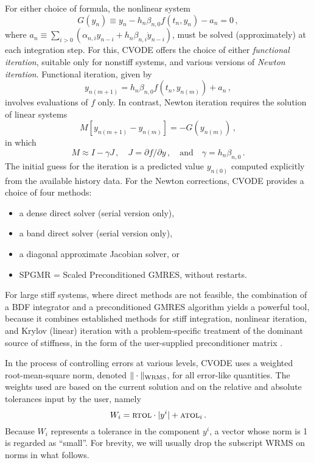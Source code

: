 For either choice of formula, the nonlinear system
\begin{equation}\label{NLS}
  G(y_n) \equiv y_n - h_n \beta_{n,0} f(t_n,y_n) - a_n = 0 \, ,
\end{equation}
where $a_n\equiv\sum_{i>0}(\alpha_{n,i}y_{n-i}+h_n\beta_{n,i}\dot{y}_{n-i})$, 
must be solved (approximately) at each integration step.  For this, CVODE
offers the choice of either {\em functional iteration}, suitable only
for nonstiff systems, and various versions of {\em Newton iteration}.
Functional iteration, given by
\[ y_{n(m+1)} = h_n \beta_{n,0} f(t_n,y_{n(m)}) + a_n \, , \]
involves evaluations of $f$ only.  In contrast, Newton iteration requires
the solution of linear systems
\begin{equation*}
  M [y_{n(m+1)} - y_{n(m)}] = -G(y_{n(m)}) \, ,
\end{equation*}
in which
\begin{equation}\label{Newtonmat} 
  M \approx I - \gamma J \, ,
  \quad J = \partial f / \partial y \, ,
  \quad \mbox{and} \quad
  \gamma = h_n \beta_{n,0} \, . 
\end{equation}
The initial guess for the iteration is a predicted value $y_{n(0)}$
computed explicitly from the available history data.
For the Newton corrections, CVODE provides a choice of four methods:
\begin{itemize}
\item a dense direct solver (serial version only),
\item a band direct solver (serial version only),
\item a diagonal approximate Jacobian solver, or
\item SPGMR = Scaled Preconditioned GMRES, without restarts.
\end{itemize}
For large stiff systems, where direct methods are not feasible, the
combination of a BDF integrator and a preconditioned GMRES algorithm
yields a powerful tool, because it combines established methods for
stiff integration, nonlinear iteration, and Krylov (linear) iteration
with a problem-specific treatment of the dominant source of stiffness,
in the form of the user-supplied preconditioner matrix \cite{BrHi:89}.

In the process of controlling errors at various levels, CVODE uses a
weighted root-mean-square norm, denoted $\|\cdot\|_{\mbox{\scriptsize
WRMS}}$, for all 
error-like quantities.  The weights used are based on the current
solution and on the relative and absolute tolerances input by the
user, namely
\begin{equation}\label{errwt}
 W_i = \mbox{\sc rtol} \cdot |y^i| + \mbox{\sc atol}_i \, .
\end{equation}
Because $W_i$ represents a tolerance in the component $y^i$, a vector
whose norm is 1 is regarded as ``small''.  For brevity, we will
usually drop the subscript WRMS on norms in what follows.

